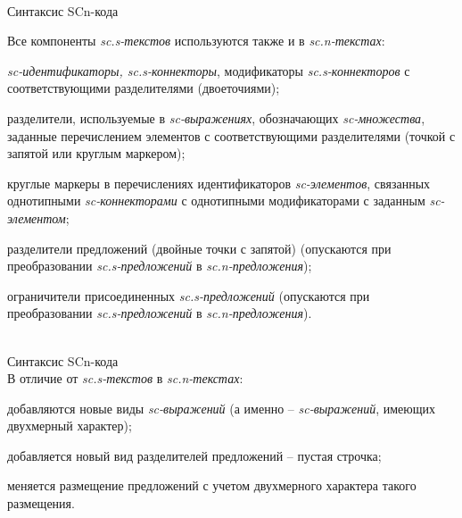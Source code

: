 \begin{frame}{\\Синтаксис SCn-кода}
	\topline
	\justifying
	\vspace*{\fill}\\
	\small{
		Все компоненты \textit{sc.s-текстов} используются также и в \textit{sc.n-текстах}:
		\begin{textitemize}
			\item \textit{sc-идентификаторы, sc.s-коннекторы}, модификаторы \textit{sc.s-коннекторов} с соответствующими разделителями (двоеточиями);
			\item разделители, используемые в \textit{sc-выражениях}, обозначающих \textit{sc-множества}, заданные перечислением элементов с соответствующими разделителями (точкой с запятой или круглым маркером);
			\item круглые маркеры в перечислениях идентификаторов \textit{sc-элементов}, связанных однотипными \textit{sc-коннекторами} с однотипными модификаторами с заданным \textit{sc-элементом};
			\item разделители предложений (двойные точки с запятой) (опускаются при преобразовании \textit{sc.s-предложений} в \textit{sc.n-предложения});
			\item ограничители присоединенных \textit{sc.s-предложений} (опускаются при преобразовании \textit{sc.s-предложений} в \textit{sc.n-предложения}).
		\end{textitemize}
	}
\end{frame}

\begin{frame}{\\Синтаксис SCn-кода}
	\topline
	\justifying
	\vspace*{\fill}\\
	В отличие от \textit{sc.s-текстов} в \textit{sc.n-текстах}:
	\begin{textitemize}
		\item добавляются новые виды \textit{sc-выражений} (а именно – \textit{sc-выражений}, имеющих двухмерный характер);
		\item добавляется новый вид разделителей предложений – пустая строчка;
		\item меняется размещение предложений с учетом двухмерного характера такого размещения.
	\end{textitemize}
\end{frame}


